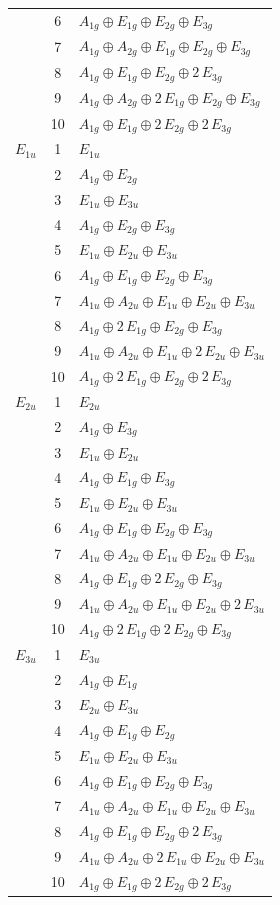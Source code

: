 \documentclass[11pt]{article}
\begin{document}
\begin{longtable}{l c p{}}
 & 6 & $A_{1g}\oplus E_{1g}\oplus E_{2g}\oplus E_{3g}$\\
 & 7 & $A_{1g}\oplus A_{2g}\oplus E_{1g}\oplus E_{2g}\oplus E_{3g}$\\
 & 8 & $A_{1g}\oplus E_{1g}\oplus E_{2g}\oplus 2\,E_{3g}$\\
 & 9 & $A_{1g}\oplus A_{2g}\oplus 2\,E_{1g}\oplus E_{2g}\oplus E_{3g}$\\
 & 10 & $A_{1g}\oplus E_{1g}\oplus 2\,E_{2g}\oplus 2\,E_{3g}$\\
\hline
$E_{1u}$ & 1 & $E_{1u}$\\
 & 2 & $A_{1g}\oplus E_{2g}$\\
 & 3 & $E_{1u}\oplus E_{3u}$\\
 & 4 & $A_{1g}\oplus E_{2g}\oplus E_{3g}$\\
 & 5 & $E_{1u}\oplus E_{2u}\oplus E_{3u}$\\
 & 6 & $A_{1g}\oplus E_{1g}\oplus E_{2g}\oplus E_{3g}$\\
 & 7 & $A_{1u}\oplus A_{2u}\oplus E_{1u}\oplus E_{2u}\oplus E_{3u}$\\
 & 8 & $A_{1g}\oplus 2\,E_{1g}\oplus E_{2g}\oplus E_{3g}$\\
 & 9 & $A_{1u}\oplus A_{2u}\oplus E_{1u}\oplus 2\,E_{2u}\oplus E_{3u}$\\
 & 10 & $A_{1g}\oplus 2\,E_{1g}\oplus E_{2g}\oplus 2\,E_{3g}$\\
\hline
$E_{2u}$ & 1 & $E_{2u}$\\
 & 2 & $A_{1g}\oplus E_{3g}$\\
 & 3 & $E_{1u}\oplus E_{2u}$\\
 & 4 & $A_{1g}\oplus E_{1g}\oplus E_{3g}$\\
 & 5 & $E_{1u}\oplus E_{2u}\oplus E_{3u}$\\
 & 6 & $A_{1g}\oplus E_{1g}\oplus E_{2g}\oplus E_{3g}$\\
 & 7 & $A_{1u}\oplus A_{2u}\oplus E_{1u}\oplus E_{2u}\oplus E_{3u}$\\
 & 8 & $A_{1g}\oplus E_{1g}\oplus 2\,E_{2g}\oplus E_{3g}$\\
 & 9 & $A_{1u}\oplus A_{2u}\oplus E_{1u}\oplus E_{2u}\oplus 2\,E_{3u}$\\
 & 10 & $A_{1g}\oplus 2\,E_{1g}\oplus 2\,E_{2g}\oplus E_{3g}$\\
\hline
$E_{3u}$ & 1 & $E_{3u}$\\
 & 2 & $A_{1g}\oplus E_{1g}$\\
 & 3 & $E_{2u}\oplus E_{3u}$\\
 & 4 & $A_{1g}\oplus E_{1g}\oplus E_{2g}$\\
 & 5 & $E_{1u}\oplus E_{2u}\oplus E_{3u}$\\
 & 6 & $A_{1g}\oplus E_{1g}\oplus E_{2g}\oplus E_{3g}$\\
 & 7 & $A_{1u}\oplus A_{2u}\oplus E_{1u}\oplus E_{2u}\oplus E_{3u}$\\
 & 8 & $A_{1g}\oplus E_{1g}\oplus E_{2g}\oplus 2\,E_{3g}$\\
 & 9 & $A_{1u}\oplus A_{2u}\oplus 2\,E_{1u}\oplus E_{2u}\oplus E_{3u}$\\
 & 10 & $A_{1g}\oplus E_{1g}\oplus 2\,E_{2g}\oplus 2\,E_{3g}$\\
\hline
\end{longtable}
\end{document}
